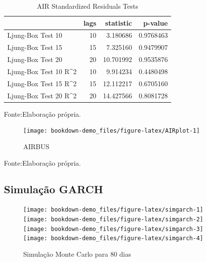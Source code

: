 \documentclass[
  12pt,
  a4paper,
  openany]{book}
\begin{document}
\begin{table}[!h]

\caption{\label{tab:unnamed-chunk-42}AIR Standardized Residuals Tests}
\centering
\begin{tabular}[t]{lrrr}
\toprule
  & lags & statistic & p-value\\
\midrule
Ljung-Box Test 10 & 10 & 3.180686 & 0.9768463\\
Ljung-Box Test 15 & 15 & 7.325160 & 0.9479907\\
Ljung-Box Test 20 & 20 & 10.701992 & 0.9535876\\
Ljung-Box Test 10 R\textasciicircum{}2 & 10 & 9.914234 & 0.4480498\\
Ljung-Box Test 15 R\textasciicircum{}2 & 15 & 12.112217 & 0.6705160\\
\addlinespace
Ljung-Box Test 20 R\textasciicircum{}2 & 20 & 14.427566 & 0.8081728\\
\bottomrule
\end{tabular}
\end{table}
\FloatBarrier
\centering

Fonte:Elaboração própria.

\justifying
\bigskip
\begin{figure}

{\centering \texttt{[image: bookdown-demo\_files/figure-latex/AIRplot-1]} 

}

\caption{AIRBUS}\label{fig:AIRplot}
\end{figure}
\FloatBarrier
\centering

Fonte:Elaboração própria.

\justifying
\bigskip

\hypertarget{simulauxe7uxe3o-garch}{%
\subsection{Simulação GARCH}\label{simulauxe7uxe3o-garch}}

\scriptsize

\normalsize

\scriptsize

\normalsize

\begin{figure}

{\centering \texttt{[image: bookdown-demo\_files/figure-latex/simgarch-1]} \texttt{[image: bookdown-demo\_files/figure-latex/simgarch-2]} \texttt{[image: bookdown-demo\_files/figure-latex/simgarch-3]} \texttt{[image: bookdown-demo\_files/figure-latex/simgarch-4]} 

}

\caption{Simulação Monte Carlo para 80 dias}\label{fig:simgarch}
\end{figure}
\end{document}

